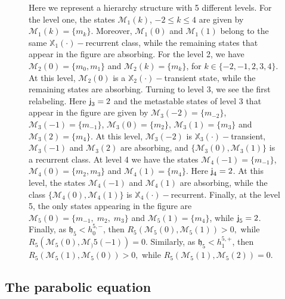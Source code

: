 \documentclass[reqno]{amsart}
\theoremstyle{plain}
\theoremstyle{definition}
\newcommand{\mf}[1]{{\mathfrak #1}}
\newcommand{\bb}[1]{{\mathbb #1}}
\newcommand{\ms}[1]{{\mathscr #1}}
\newcommand{\mss}[1]{{\textsf #1}}
\newcounter{as}[section]
\newcommand{\<}{\langle}
\renewcommand{\>}{\rangle}
\begin{document}
\begin{figure}
\caption{Here we represent a hierarchy structure with 5 different
levels. For the level one, the states $\ms M_1(k)$, $-2\leq k\leq 4$
are given by $\ms M_1(k) = \{m_k\}$. Moreover, $\ms M_1(0)$ and
$\ms M_1(1)$ belong to the same $\bb X_1(\cdot)-$recurrent class,
while the remaining states that appear in the figure are
absorbing. For the level 2, we have $\ms M_2(0) = \{m_0, m_1\}$ and
$\ms M_2(k) = \{m_k\}$, for $k\in \{-2,-1,2,3,4\}$. At this level,
$\ms M_2(0)$ is a $\bb X_2(\cdot)-$transient state, while the
remaining states are absorbing. Turning to level 3, we see the first
relabeling. Here $\mss j_3=2$ and the metastable states of level 3
that appear in the figure are given by $\ms M_3(-2)=\{m_{-2}\}$,
$\ms M_3(-1)=\{m_{-1}\}$, $\ms M_3(0) = \{m_2\}$, $\ms M_3(1)=\{m_3\}$
and $\ms M_3(2)=\{m_4\}$. At this level, $\ms M_3(-2)$ is
$\bb X_3(\cdot)-$transient, $\ms M_3(-1)$ and $\ms M_3(2)$ are
absorbing, and $\{\ms M_3(0), \ms M_3(1)\}$ is a recurrent class. At
level 4 we have the states $\ms M_4(-1) = \{m_{-1}\}$,
$\ms M_4(0) = \{m_2, m_3\}$ and $\ms M_4(1) = \{m_4\}$. Here
$\mss j_4 = 2$. At this level, the states $\ms M_4(-1)$ and
$\ms M_4(1)$ are absorbing, while the class
$\{\ms M_4(0), \ms M_4(1)\}$ is $\bb X_4(\cdot)-$recurrent. Finally,
at the level 5, the only states appearing in the figure are
$\ms M_5(0) = \{m_{-1},\; m_2,\; m_3\}$ and $\ms M_5(1) = \{m_4\}$,
while $\mss j_5=2$. Finally, as $\mf h_5 < h_0^{5,-}$, then
$R_5(\ms M_5(0), \ms M_5(1))>0,$ while
$R_5(\ms M_5(0), \ms M_)5(-1)) = 0$. Similarly, as
$\mf h_5<h_1^{5,+}$, then $R_5(\ms M_5(1), \ms M_5(0))>0,$ while
$R_5(\ms M_5(1), \ms M_5(2)) = 0$.}
\label{fig-1f}
\end{figure}



\subsection*{The parabolic equation}
\end{document}
